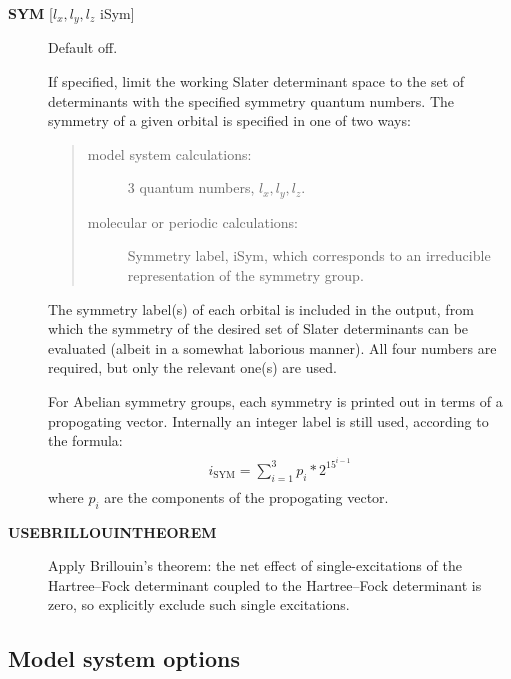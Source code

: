 \documentclass[openany,a4paper,10pt]{manual}
\begin{document}
\begin{description}
\item[\textbf{SYM} {[}$l_x,l_y,l_z$ iSym{]}]
Default off.

If specified, limit the working Slater determinant space to the set
of determinants with the specified symmetry quantum numbers. The symmetry
of a given orbital is specified in one of two ways:
\begin{quote}
\begin{description}
\item[model system calculations:]
3 quantum numbers, $l_x,l_y,l_z$.

\item[molecular or periodic calculations:]
Symmetry label, iSym, which corresponds to an irreducible
representation of the symmetry group.

\end{description}
\end{quote}

The symmetry label(s) of each orbital is included in the output,
from which the symmetry of the desired set of Slater determinants
can be evaluated (albeit in a somewhat laborious manner). All four
numbers are required, but only the relevant one(s) are used.

For Abelian symmetry groups, each symmetry is printed out in terms of
a propogating vector.  Internally an integer label is still used, according to
the formula:
\begin{align}\begin{split}i_{\textrm{SYM}} = \sum_{i=1}^3 p_i * 2^{15^{i-1}}\end{split}\end{align}
where $p_i$ are the components of the propogating vector.

\item[\textbf{USEBRILLOUINTHEOREM}]
Apply Brillouin's theorem: the net effect of single-excitations of
the Hartree--Fock determinant coupled to the Hartree--Fock determinant
is zero, so explicitly exclude such single excitations.

\end{description}


\subsection{Model system options}
\end{document}
